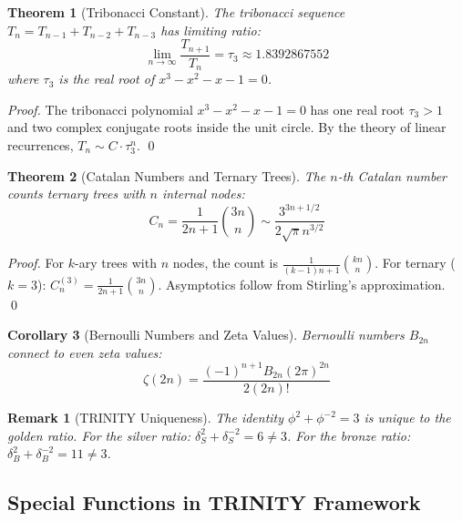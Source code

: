\documentclass[aps,prd,preprint,superscriptaddress,showpacs,nofootinbib,longbibliography]{revtex4-2}
\newtheorem{theorem}{Theorem}
\newtheorem{corollary}[theorem]{Corollary}
\newtheorem{remark}{Remark}
\begin{document}
\begin{theorem}[Tribonacci Constant]
\label{thm:tribonacci}
The tribonacci sequence $T_n = T_{n-1} + T_{n-2} + T_{n-3}$ has limiting ratio:
\begin{equation}
\lim_{n \to \infty} \frac{T_{n+1}}{T_n} = \tau_3 \approx 1.8392867552
\end{equation}
where $\tau_3$ is the real root of $x^3 - x^2 - x - 1 = 0$.
\end{theorem}

\begin{proof}
The tribonacci polynomial $x^3 - x^2 - x - 1 = 0$ has one real root $\tau_3 > 1$ and two complex conjugate roots inside the unit circle. By the theory of linear recurrences, $T_n \sim C \cdot \tau_3^n$. \qed
\end{proof}

\begin{theorem}[Catalan Numbers and Ternary Trees]
\label{thm:catalan}
The $n$-th Catalan number counts ternary trees with $n$ internal nodes:
\begin{equation}
C_n = \frac{1}{2n+1} \binom{3n}{n} \sim \frac{3^{3n+1/2}}{2\sqrt{\pi} n^{3/2}}
\end{equation}
\end{theorem}

\begin{proof}
For $k$-ary trees with $n$ nodes, the count is $\frac{1}{(k-1)n+1} \binom{kn}{n}$. For ternary ($k=3$): $C_n^{(3)} = \frac{1}{2n+1} \binom{3n}{n}$. Asymptotics follow from Stirling's approximation. \qed
\end{proof}

\begin{corollary}[Bernoulli Numbers and Zeta Values]
\label{cor:bernoulli_zeta}
Bernoulli numbers $B_{2n}$ connect to even zeta values:
\begin{equation}
\zeta(2n) = \frac{(-1)^{n+1} B_{2n} (2\pi)^{2n}}{2(2n)!}
\end{equation}
\end{corollary}

\begin{remark}[TRINITY Uniqueness]
The identity $\phi^2 + \phi^{-2} = 3$ is unique to the golden ratio. For the silver ratio: $\delta_S^2 + \delta_S^{-2} = 6 \neq 3$. For the bronze ratio: $\delta_B^2 + \delta_B^{-2} = 11 \neq 3$.
\end{remark}

\subsection{Special Functions in TRINITY Framework}
\label{sec:special_functions}
\end{document}
